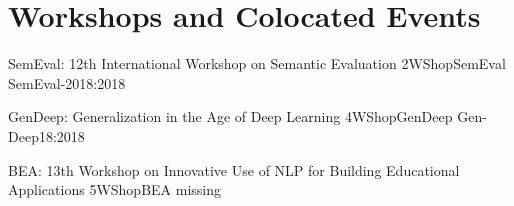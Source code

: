 \chapter[Workshops and Colocated Events: \daydate]{Workshops and Colocated Events}
\thispagestyle{emptyheader}
\vfill







\begin{wsschedule}
  {SemEval: 12th International Workshop on Semantic Evaluation}
  {2}{WShopSemEval}
{SemEval-2018:2018}
  {\WShopLocC}
  
\end{wsschedule}




\begin{wsschedule}
  {GenDeep: Generalization in the Age of Deep Learning}
  {4}{WShopGenDeep}
  {Gen-Deep18:2018}
  {\WShopLocE}
  
\end{wsschedule}

\begin{wsschedule}
  {BEA: 13th Workshop on Innovative Use of NLP for Building Educational Applications}
  {5}{WShopBEA}
  {missing}
  {\WShopLocF}
  
\end{wsschedule}


